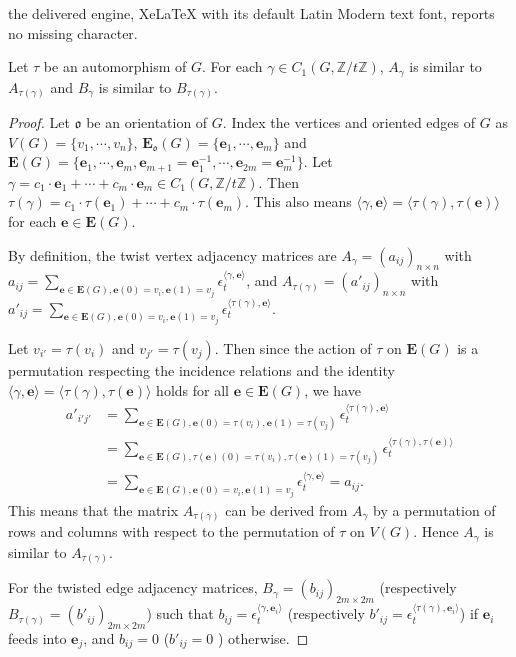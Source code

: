 \documentclass[10pt,a4paper]{amsart}
\newcommand{\mbbZ}{{\mathbb Z}}
\newcommand{\mfrako}{{\mathfrak o}}
\newcommand{\vE}{{\mathbf E}}
\newcommand{\ve}{{\mathbf e}}
\begin{document}
the delivered engine, XeLaTeX with its default Latin Modern text font, reports no missing character.
\begin{lemma} \label{L:auto}
Let $\tau$ be an automorphism of $G$. For each $\gamma\in C_1(G,\mbbZ/t\mbbZ)$, $A_\gamma$ is similar to $A_{\tau(\gamma)}$ and $B_\gamma$ is similar to $B_{\tau(\gamma)}$.
\end{lemma}

\begin{proof}
Let $\mfrako$ be an orientation of $G$. 
Index the vertices and oriented edges of $G$ as $V(G)=\{v_1,\cdots,v_n\}$, $\vE_\mfrako(G)=\{\ve_1,\cdots,\ve_m\}$ and $\vE(G)=\{\ve_1,\cdots,\ve_m,\ve_{m+1}=\ve_1^{-1},\cdots,\ve_{2m}=\ve_m^{-1}\}$.  Let $\gamma=c_1\cdot \ve_1+\cdots+c_m\cdot \ve_m\in C_1(G,\mbbZ/t\mbbZ)$. Then $\tau(\gamma)=c_1\cdot \tau(\ve_1)+\cdots+c_m\cdot \tau(\ve_m)$. This also means $\langle \gamma,\ve\rangle = \langle \tau(\gamma),\tau(\ve)\rangle$ for each $\ve\in \vE(G)$. 

By definition, the twist vertex adjacency matrices are $A_\gamma=(a_{ij})_{n\times n}$ with $a_{ij}=\sum_{\ve\in \vE(G),\ve(0)=v_i,\ve(1)=v_j} \epsilon_t^{\langle\gamma,\ve\rangle}$, and $A_{\tau(\gamma)}=(a'_{ij})_{n\times n}$ with $a'_{ij}=\sum_{\ve\in \vE(G),\ve(0)=v_i,\ve(1)=v_j} \epsilon_t^{\langle\tau(\gamma),\ve\rangle}$. 

Let $v_{i'}=\tau(v_i)$ and $v_{j'}=\tau(v_j)$. Then since the action of $\tau$  on $\vE(G)$ is a permutation respecting the incidence relations and the identity $\langle \gamma,\ve\rangle = \langle \tau(\gamma),\tau(\ve)\rangle$ holds for all $\ve\in \vE(G)$, we have
\begin{align*}
a'_{i'j'}&=\sum_{\ve\in \vE(G),\ve(0)=\tau(v_i),\ve(1)=\tau(v_j)} \epsilon_t^{\langle\tau(\gamma),\ve\rangle} \\
&=\sum_{\ve\in \vE(G),\tau(\ve)(0)=\tau(v_i),\tau(\ve)(1)=\tau(v_j)} \epsilon_t^{\langle\tau(\gamma),\tau(\ve)\rangle} \\
&=\sum_{\ve\in \vE(G),\ve(0)=v_i,\ve(1)=v_j} \epsilon_t^{\langle\gamma,\ve\rangle} = a_{ij}. 
\end{align*}
This means that the matrix $A_{\tau(\gamma)}$ can be derived from $A_\gamma$ by a permutation of rows and columns with respect to the permutation of $\tau$ on $V(G)$. Hence $A_\gamma$ is similar to $A_{\tau(\gamma)}$. 

For the twisted edge adjacency matrices, $B_\gamma=(b_{ij})_{2m\times 2m}$ (respectively $B_{\tau(\gamma)}=(b'_{ij})_{2m\times 2m}$) such that $b_{ij} =\epsilon_t^{\langle\gamma,\ve_i\rangle}$ (respectively $b'_{ij} =\epsilon_t^{\langle\tau(\gamma),\ve_i\rangle}$) if $\ve_i$ feeds into $\ve_j$, and $b_{ij}=0$ ($b'_{ij}=0$ ) otherwise.


\end{proof}
\end{document}
